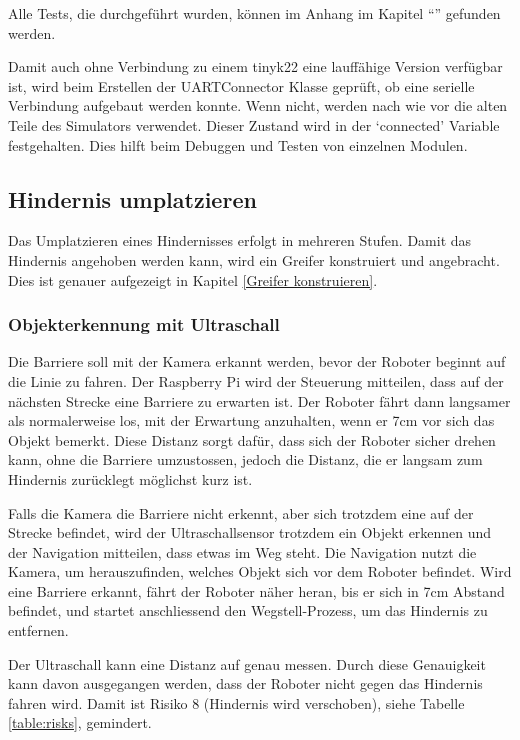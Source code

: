 Alle Tests, die durchgeführt wurden, können im Anhang im Kapitel ``'' gefunden werden.

Damit auch ohne Verbindung zu einem \gls{tinyk22} eine lauffähige Version verfügbar ist, wird beim Erstellen der UARTConnector Klasse geprüft, ob eine serielle Verbindung aufgebaut werden konnte. Wenn nicht, werden nach wie vor die alten Teile des Simulators verwendet. Dieser Zustand wird in der `connected' Variable festgehalten. Dies hilft beim Debuggen und Testen von einzelnen Modulen.


\newpage
\subsection{Hindernis umplatzieren}

Das Umplatzieren eines Hindernisses erfolgt in mehreren Stufen. Damit das Hindernis angehoben werden kann, wird ein Greifer konstruiert und angebracht. Dies ist genauer aufgezeigt in Kapitel \ref{Greifer konstruieren}.

\subsubsection{Objekterkennung mit Ultraschall}
\label{hindernis-um-ultraschall}

Die Barriere soll mit der Kamera erkannt werden, bevor der Roboter beginnt auf die Linie zu fahren. Der Raspberry Pi wird der Steuerung mitteilen, dass auf der nächsten Strecke eine Barriere zu erwarten ist. Der Roboter fährt dann langsamer als normalerweise los, mit der Erwartung anzuhalten, wenn er 7cm vor sich das Objekt bemerkt. Diese Distanz sorgt dafür, dass sich der Roboter sicher drehen kann, ohne die Barriere umzustossen, jedoch die Distanz, die er langsam zum Hindernis zurücklegt möglichst kurz ist.

Falls die Kamera die Barriere nicht erkennt, aber sich trotzdem eine auf der Strecke befindet, wird der Ultraschallsensor trotzdem ein Objekt erkennen und der Navigation mitteilen, dass etwas im Weg steht. Die Navigation nutzt die Kamera, um herauszufinden, welches Objekt sich vor dem Roboter befindet. Wird eine Barriere erkannt, fährt der Roboter näher heran, bis er sich in 7cm Abstand befindet, und startet anschliessend den Wegstell-Prozess, um das Hindernis zu entfernen.

Der Ultraschall kann eine Distanz auf \pm 1cm genau messen. Durch diese Genauigkeit kann davon ausgegangen werden, dass der Roboter nicht gegen das Hindernis fahren wird. Damit ist Risiko 8 (Hindernis wird verschoben), siehe Tabelle \ref{table:risks}, gemindert.

